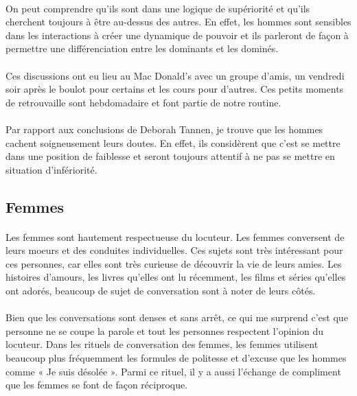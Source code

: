 \paragraph{} On peut comprendre qu'ils sont dans une logique de supériorité et
qu'ils cherchent toujours à être au-dessus des autres. En effet, les hommes
sont sensibles dans les interactions à créer une dynamique de pouvoir et ils
parleront de façon à permettre une différenciation entre les dominants et les
dominés.

\paragraph{} Ces discussions ont eu lieu au Mac Donald's avec un groupe d'amis,
un vendredi soir après le boulot pour certains et les cours pour d'autres. Ces
petits moments de retrouvaille sont hebdomadaire et font partie de notre
routine.

\paragraph{} Par rapport aux conclusions de Deborah Tannen, je trouve que les
hommes cachent soigneusement leurs doutes. En effet, ils considèrent que c'est
se mettre dans une position de faiblesse et seront toujours attentif à ne pas
se mettre en situation d'infériorité.

\subsection{Femmes}

\paragraph{} Les femmes sont hautement respectueuse du
locuteur. Les femmes conversent de leurs moeurs et des conduites individuelles.
Ces sujets sont très intéressant pour ces personnes, car elles sont très
curieuse de découvrir la vie de leurs amies. Les histoires d'amours, les livres
qu'elles ont lu récemment, les films et séries qu'elles ont adorés, beaucoup de
sujet de conversation sont à noter de leurs côtés.

\paragraph{} Bien que les conversations sont denses et sans arrêt, ce qui me
surprend c'est que personne ne se coupe la parole et tout les personnes
respectent l'opinion du locuteur. Dans les rituels de conversation des femmes,
les femmes utilisent beaucoup plus fréquemment les formules de politesse et
d'excuse que les hommes comme « Je suis désolée ». Parmi ce rituel, il y a
aussi l'échange de compliment que les femmes se font de façon réciproque.

